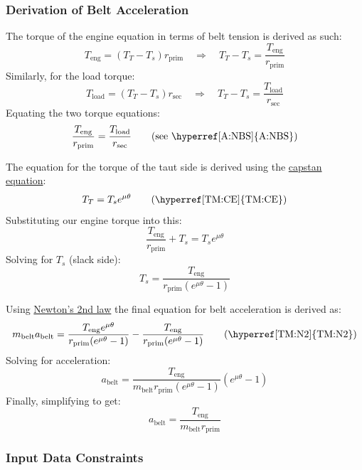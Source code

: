\documentclass[12pt]{article}
\newcommand{\hpref}[1]{\hyperref[#1]{#1}}
\begin{document}
\subsubsection*{Derivation of Belt Acceleration}

The torque of the engine equation in terms of belt tension is derived as such: \\
\[T_{\text{eng}} = (T_T - T_s) r_{\text{prim}} \quad \Rightarrow \quad T_T - T_s = \frac{T_{\text{eng}}}{r_{\text{prim}}}\] %
Similarly, for the load torque: \\
\[T_{\text{load}} = (T_T - T_s) r_{\text{sec}} \quad \Rightarrow \quad T_T - T_s = \frac{T_{\text{load}}}{r_{\text{sec}}}\] %
Equating the two torque equations: \\
\[\frac{T_{\text{eng}}}{r_{\text{prim}}} = \frac{T_{\text{load}}}{r_{\text{sec}}} \tag*{\text{(see \hpref{A:NBS})}}\] 
{\newline}

The equation for the torque of the taut side is derived using the \hyperref[TM:CE]{capstan equation}:
\[T_T = T_s e^{\mu \theta} \tag*{\text{(\hyperref[TM:CE]{TM:CE})}}\]
Substituting our engine torque into this: \\
\[\frac{T_{\text{eng}}}{r_{\text{prim}}} + T_s = T_s e^{\mu \theta}\]
Solving for \(T_s\) (slack side): \\
\[T_s = \frac{T_{\text{eng}}}{r_{\text{prim}} (e^{\mu \theta} - 1)}\]
{\newline}

Using \hyperref[TM:N2]{Newton's 2nd law} the final equation for belt acceleration is derived as: \\
\[m_\text{belt} a_{\text{belt}} = \frac{T_{\text{eng}} e^{\mu \theta}}{r_{\text{prim}} (e^{\mu \theta} - 1)} - \frac{T_{\text{eng}}}{r_{\text{prim}} (e^{\mu \theta} - 1)}  \tag*{\text{(\hyperref[TM:N2]{TM:N2})}}\]
Solving for acceleration: \\
\[a_{\text{belt}} = \frac{T_{\text{eng}}}{m_\text{belt} r_{\text{prim}} (e^{\mu \theta} - 1)} (e^{\mu \theta} - 1)\]
Finally, simplifying to get: \\
\[a_{\text{belt}} = \frac{T_{\text{eng}}}{m_\text{belt} r_{\text{prim}}}\]



\subsubsection{Input Data Constraints} \label{sec_DataConstraints}    
\end{document}
